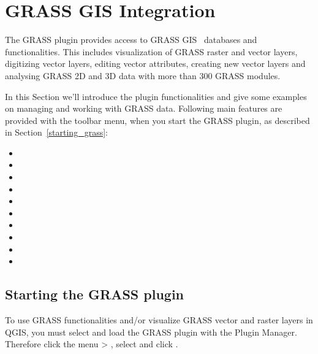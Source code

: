 \section{GRASS GIS Integration}\label{sec:grass}


The GRASS plugin provides access to GRASS GIS~\cite{GRASSweb} databases and functionalities. This includes visualization of GRASS raster and vector layers, digitizing vector layers, editing vector attributes, creating new vector layers and analysing GRASS 2D and 3D data with more than 300 GRASS modules.

In this Section we'll introduce the plugin functionalities and give some 
examples on managing and working with GRASS data. Following main features are provided with the toolbar menu, when you start the GRASS plugin, as described in Section~\ref{starting_grass}:
 
\begin{itemize}
\item {}
\item {}
\item {}
\item {}
\item {}
\item {}
\item {}
\item {}
\item {} 
\item {}
\end{itemize}

\subsection{Starting the GRASS plugin}\label{sec:starting_grass}

To use GRASS functionalities and/or visualize GRASS vector and raster layers in QGIS, you must select and load the GRASS plugin with the Plugin Manager. Therefore click the menu  > , select  and click . 

